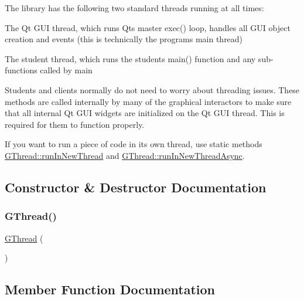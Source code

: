 The library has the following two standard threads running at all times\+:


\begin{DoxyEnumerate}
\item The Qt G\+UI thread, which runs Qt\textquotesingle{}s master exec() loop, handles all G\+UI object creation and events (this is technically the program\textquotesingle{}s main thread)


\item The student thread, which runs the student\textquotesingle{}s main() function and any sub-\/functions called by main

Students and clients normally do not need to worry about threading issues. These methods are called internally by many of the graphical interactors to make sure that all internal Qt G\+UI widgets are initialized on the Qt G\+UI thread. This is required for them to function properly.

If you want to run a piece of code in its own thread, use static methods {\ttfamily \mbox{\hyperlink{classGThread_ad70a32318f3f0a9cf25582379c6d7ffb}{G\+Thread\+::run\+In\+New\+Thread}}} and {\ttfamily \mbox{\hyperlink{classGThread_ad677139bc51c13b4dd55f0c15c7d9624}{G\+Thread\+::run\+In\+New\+Thread\+Async}}}. 
\end{DoxyEnumerate}

\subsection{Constructor \& Destructor Documentation}
\mbox{\label{classGThread_a7db4904140090c18f864e09283f2b529}} 
\subsubsection{\texorpdfstring{G\+Thread()}{GThread()}}
{\footnotesize\ttfamily \mbox{\hyperlink{classGThread}{G\+Thread}} (\begin{DoxyParamCaption}{ }\end{DoxyParamCaption})\hspace{0.3cm}{\ttfamily [protected]}}



\subsection{Member Function Documentation}
\mbox{\label{classGThread_a27a1f5f9657637e4a4b6a7127ca9da33}} 
